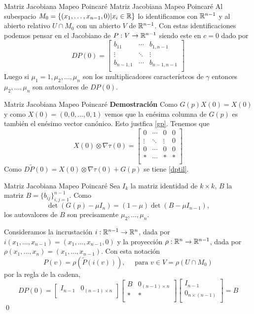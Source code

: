 {Matriz Jacobiana Mapeo Poincaré}
{Matriz Jacobiana Mapeo Poincaré}
Al subespacio $M_0=\{(x_1,\ldots,x_{n-1},0)|x_i\in\mathbb{R}\}$ lo identificamos con $\mathbb{R}^{n-1}$ y al abierto relativo $U\cap M_0$ con un abierto $V$ de $\mathbb{R}^{n-1}$. 
Con estas identificaciones podemos pensar en el Jacobiano de $P:V\to \mathbb{R}^{n-1}$ siendo este en $c=0$ dado por
 \begin{equation}\label{dp}DP(0)=\begin{bmatrix}
         b_{11}&\cdots&b_{1,n-1}\\
        \vdots &\ddots&\vdots\\
         b_{n-1,1}&\cdots&b_{n-1,n-1}\\
        \end{bmatrix}
\end{equation}
Luego si $\mu_1=1,\mu_2,\ldots,\mu_n$ son los multiplicadores característcos de $\gamma$ entonces $\mu_2,\ldots,\mu_n$ son autovalores de $DP(0)$.







{Matriz Jacobiana Mapeo Poincaré}
\textbf{Demostración} Como $G(p)X(0)=X(0)$ y como $X(0)=(0,0,\ldots,0,1)$ vemos que la enésima columna de $G(p)$ es también el enésimo vector canónico. Esto justfica 
\eqref{gp}.
Tenemos que
\[
 X(0)\otimes\nabla\tau(0)=\begin{bmatrix}
         0&\cdots&0&0\\
        \vdots &\ddots&\vdots&0\\
         0&\cdots&0&0\\
         *&\cdots&*&*\\
        \end{bmatrix}
\]
Como $D\tilde{P}(0)=X(0)\otimes\nabla\tau(0)+G(p)$ se tiene \eqref{dptil}.



{Matriz Jacobiana Mapeo Poincaré}
Sea $I_k$ la matriz identidad de $k\times k$, $B$ la matriz $B=\{b_{ij}\}_{i,j=1}^{n-1}$. Como
\[\det (G(p)-\mu I_n)=(1-\mu)\det (B-\mu I_{n-1}),\]
los autovalores de $B$ son precisamente $\mu_2,\ldots,\mu_n$.

Consideramos la incrustación $i:\mathbb{R}^{n-1}\to\mathbb{R}^n$, dada por $i(x_1,\ldots,x_{n-1})=(x_1,\ldots,x_{n-1},0)$ y la proyección
 $\rho:\mathbb{R}^{n}\to\mathbb{R}^{n-1}$,  dada por $\rho(x_1,\ldots,x_{n})=(x_1,\ldots,x_{n-1})$. Con esta notación
 \[P(v)=\rho(\tilde{P}(i(v))),\quad\text{ para } v\in V=\rho(U\cap M_0)\]
 por la regla de la cadena,
 \[DP(0)=\begin{bmatrix}
         I_{n-1}&0_{(n-1)\times n}\\
        \end{bmatrix}
        \begin{bmatrix}
         B&0_{(n-1)\times n}\\
         *&*\\
        \end{bmatrix}
        \begin{bmatrix}
         I_{n-1}\\0_{n\times (n-1)}\\
        \end{bmatrix} =B
  \]
\qed


